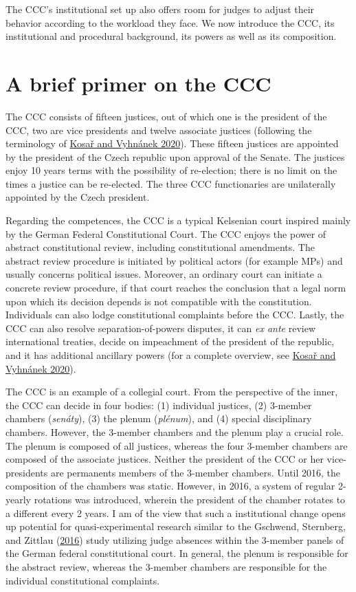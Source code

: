 \documentclass[
  11pt,
]{article}
\begin{document}
The CCC's institutional set up also offers room for judges to adjust
their behavior according to the workload they face. We now introduce the
CCC, its institutional and procedural background, its powers as well as
its composition.

\hypertarget{primer}{%
\section{A brief primer on the CCC}\label{primer}}

The CCC consists of fifteen justices, out of which one is the president
of the CCC, two are vice presidents and twelve associate justices
(following the terminology of
\protect\hyperlink{ref-kosarConstitutionalCourtCzechia2020}{Kosař and
Vyhnánek 2020}). These fifteen justices are appointed by the president
of the Czech republic upon approval of the Senate. The justices enjoy 10
years terms with the possibility of re-election; there is no limit on
the times a justice can be re-elected. The three CCC functionaries are
unilaterally appointed by the Czech president.

Regarding the competences, the CCC is a typical Kelsenian court inspired
mainly by the German Federal Constitutional Court. The CCC enjoys the
power of abstract constitutional review, including constitutional
amendments. The abstract review procedure is initiated by political
actors (for example MPs) and usually concerns political issues.
Moreover, an ordinary court can initiate a concrete review procedure, if
that court reaches the conclusion that a legal norm upon which its
decision depends is not compatible with the constitution. Individuals
can also lodge constitutional complaints before the CCC. Lastly, the CCC
can also resolve separation-of-powers disputes, it can \emph{ex ante}
review international treaties, decide on impeachment of the president of
the republic, and it has additional ancillary powers (for a complete
overview, see
\protect\hyperlink{ref-kosarConstitutionalCourtCzechia2020}{Kosař and
Vyhnánek 2020}).

The CCC is an example of a collegial court. From the perspective of the
inner, the CCC can decide in four bodies: (1) individual justices, (2)
3-member chambers (\emph{senáty}), (3) the plenum (\emph{plénum}), and
(4) special disciplinary chambers. However, the 3-member chambers and
the plenum play a crucial role. The plenum is composed of all justices,
whereas the four 3-member chambers are composed of the associate
justices. Neither the president of the CCC or her vice-presidents are
permanents members of the 3-member chambers. Until 2016, the composition
of the chambers was static. However, in 2016, a system of regular
2-yearly rotations was introduced, wherein the president of the chamber
rotates to a different every 2 years. I am of the view that such a
institutional change opens up potential for quasi-experimental research
similar to the Gschwend, Sternberg, and Zittlau
(\protect\hyperlink{ref-gschwendAreJudgesPolitical2016}{2016}) study
utilizing judge absences within the 3-member panels of the German
federal constitutional court. In general, the plenum is responsible for
the abstract review, whereas the 3-member chambers are responsible for
the individual constitutional complaints.
\end{document}
